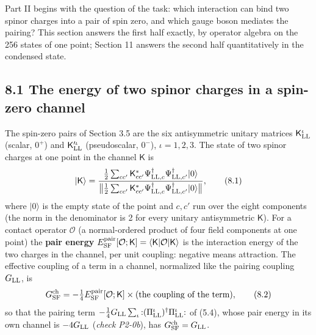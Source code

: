 \documentclass[
  10pt,
]{article}
\begin{document}
Part II begins with the question of the task: which interaction can bind
two spinor charges into a pair of spin zero, and which gauge boson
mediates the pairing? This section answers the first half exactly, by
operator algebra on the 256 states of one point; Section 11 answers the
second half quantitatively in the condensed state.

\hypertarget{the-energy-of-two-spinor-charges-in-a-spin-zero-channel}{%
\subsection{8.1 The energy of two spinor charges in a spin-zero
channel}\label{the-energy-of-two-spinor-charges-in-a-spin-zero-channel}}

The spin-zero pairs of Section 3.5 are the six antisymmetric unitary
matrices \(\mathsf K^\iota_{\rm LL}\) (scalar, \(0^+\)) and
\(\mathsf K'^\iota_{\rm LL}\) (pseudoscalar, \(0^-\)), \(\iota=1,2,3\).
The state of two spinor charges at one point in the channel
\(\mathsf K\) is
\[\lvert\mathsf K\rangle=\frac{\tfrac12\sum_{cc'}\mathsf K^*_{cc'}\Psi^\dagger_{{\rm LL},c}\Psi^\dagger_{{\rm LL},c'}\lvert0\rangle}{\big\lVert\tfrac12\sum_{cc'}\mathsf K^*_{cc'}\Psi^\dagger_{{\rm LL},c}\Psi^\dagger_{{\rm LL},c'}\lvert0\rangle\big\rVert},\tag{8.1}\]
where \(\lvert0\rangle\) is the empty state of the point and \(c,c'\)
run over the eight components (the norm in the denominator is 2 for
every unitary antisymmetric \(\mathsf K\)). For a contact operator
\(\mathcal O\) (a normal-ordered product of four field components at one
point) the \textbf{pair energy}
\(E^{\rm pair}_{\rm SF}[\mathcal O;\mathsf K]=\langle\mathsf K\rvert\mathcal O\lvert\mathsf K\rangle\)
is the interaction energy of the two charges in the channel, per unit
coupling: negative means attraction. The effective coupling of a term in
a channel, normalized like the pairing coupling \(G_{\rm LL}\), is
\[G^{\rm ch}_{\rm SF}=-\tfrac14E^{\rm pair}_{\rm SF}[\mathcal O;\mathsf K]\times(\text{the coupling of the term}),\tag{8.2}\]
so that the pairing term
\(-\tfrac14G_{\rm LL}\sum_\iota{:}(\Pi^\iota_{\rm LL})^\dagger\Pi^\iota_{\rm LL}{:}\)
of (5.4), whose pair energy in its own channel is \(-4G_{\rm LL}\)
(\emph{check P2-0b}), has \(G^{\rm ch}_{\rm SF}=G_{\rm LL}\).
\end{document}

